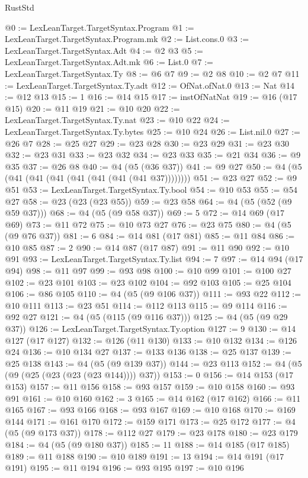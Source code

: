 \begin{lexlean}{RustStd}
\begin{coremodule}
@0 := LexLeanTarget.TargetSyntax.Program
@1 := LexLeanTarget.TargetSyntax.Program.mk
@2 := List.cons.{0}
@3 := LexLeanTarget.TargetSyntax.Adt
@4 := @2 @3
@5 := LexLeanTarget.TargetSyntax.Adt.mk
@6 := List.{0}
@7 := LexLeanTarget.TargetSyntax.Ty
@8 := @6 @7
@9 := @2 @8
@10 := @2 @7
@11 := LexLeanTarget.TargetSyntax.Ty.adt
@12 := OfNat.ofNat.{0}
@13 := Nat
@14 := @12 @13
@15 := 1
@16 := @14 @15
@17 := instOfNatNat
@19 := @16 (@17 @15)
@20 := @11 @19
@21 := @10 @20
@22 := LexLeanTarget.TargetSyntax.Ty.nat
@23 := @10 @22
@24 := LexLeanTarget.TargetSyntax.Ty.bytes
@25 := @10 @24
@26 := List.nil.{0}
@27 := @26 @7
@28 := @25 @27
@29 := @23 @28
@30 := @23 @29
@31 := @23 @30
@32 := @23 @31
@33 := @23 @32
@34 := @23 @33
@35 := @21 @34
@36 := @9 @35
@37 := @26 @8
@40 := @4 (@5 (@36 @37))
@41 := @9 @27
@50 := @4 (@5 (@41 (@41 (@41 (@41 (@41 (@41 (@41 @37))))))))
@51 := @23 @27
@52 := @9 @51
@53 := LexLeanTarget.TargetSyntax.Ty.bool
@54 := @10 @53
@55 := @54 @27
@58 := @23 (@23 (@23 @55))
@59 := @23 @58
@64 := @4 (@5 (@52 (@9 @59 @37)))
@68 := @4 (@5 (@9 @58 @37))
@69 := 5
@72 := @14 @69 (@17 @69)
@73 := @11 @72
@75 := @10 @73 @27
@76 := @23 @75
@80 := @4 (@5 (@9 @76 @37))
@81 := 6
@84 := @14 @81 (@17 @81)
@85 := @11 @84
@86 := @10 @85
@87 := 2
@90 := @14 @87 (@17 @87)
@91 := @11 @90
@92 := @10 @91
@93 := LexLeanTarget.TargetSyntax.Ty.list
@94 := 7
@97 := @14 @94 (@17 @94)
@98 := @11 @97
@99 := @93 @98
@100 := @10 @99
@101 := @100 @27
@102 := @23 @101
@103 := @23 @102
@104 := @92 @103
@105 := @25 @104
@106 := @86 @105
@110 := @4 (@5 (@9 @106 @37))
@111 := @93 @22
@112 := @10 @111
@113 := @23 @51
@114 := @112 @113
@115 := @9 @114
@116 := @92 @27
@121 := @4 (@5 (@115 (@9 @116 @37)))
@125 := @4 (@5 (@9 @29 @37))
@126 := LexLeanTarget.TargetSyntax.Ty.option
@127 := 9
@130 := @14 @127 (@17 @127)
@132 := @126 (@11 @130)
@133 := @10 @132
@134 := @126 @24
@136 := @10 @134 @27
@137 := @133 @136
@138 := @25 @137
@139 := @25 @138
@143 := @4 (@5 (@9 @139 @37))
@144 := @23 @113
@152 := @4 (@5 (@9 (@25 (@23 (@23 (@23 @144)))) @37))
@153 := 0
@156 := @14 @153 (@17 @153)
@157 := @11 @156
@158 := @93 @157
@159 := @10 @158
@160 := @93 @91
@161 := @10 @160
@162 := 3
@165 := @14 @162 (@17 @162)
@166 := @11 @165
@167 := @93 @166
@168 := @93 @167
@169 := @10 @168
@170 := @169 @144
@171 := @161 @170
@172 := @159 @171
@173 := @25 @172
@177 := @4 (@5 (@9 @173 @37))
@178 := @112 @27
@179 := @23 @178
@180 := @23 @179
@184 := @4 (@5 (@9 @180 @37))
@185 := 11
@188 := @14 @185 (@17 @185)
@189 := @11 @188
@190 := @10 @189
@191 := 13
@194 := @14 @191 (@17 @191)
@195 := @11 @194
@196 := @93 @195
@197 := @10 @196

\end{coremodule}
\end{lexlean}
